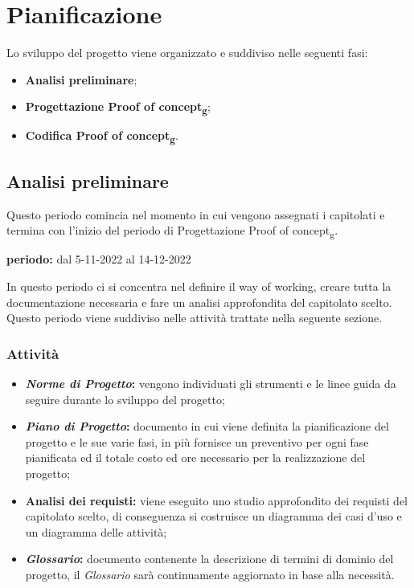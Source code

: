 \section{Pianificazione}
Lo sviluppo del progetto viene organizzato e suddiviso nelle seguenti fasi:
\begin{itemize}
\item \textbf{Analisi preliminare};
\item \textbf{Progettazione Proof of concept\textsubscript{g}};
\item \textbf{Codifica Proof of concept\textsubscript{g}}.
\end{itemize}


\subsection{Analisi preliminare}
Questo periodo comincia nel momento in cui vengono assegnati i capitolati e termina con l'inizio del periodo di Progettazione Proof of concept\textsubscript{g}.\\
\begin{center}
\textbf{periodo:} dal 5-11-2022 al 14-12-2022\\
\end{center}
In questo periodo ci si concentra nel definire il way of working, creare tutta la documentazione necessaria e fare un analisi approfondita del capitolato scelto.  Questo periodo viene suddiviso nelle attività trattate nella seguente sezione.

\subsubsection{Attività}
\begin{itemize}
\item \textbf{\textit{Norme di Progetto}:} vengono individuati gli strumenti e le linee guida da seguire durante lo sviluppo del progetto;
\item \textbf{\textit{Piano di Progetto}:} documento in cui viene definita la pianificazione del progetto e le sue varie fasi,  in più fornisce un preventivo per ogni fase pianificata ed il totale costo ed ore necessario per la realizzazione del progetto;
\item \textbf{Analisi dei requisti:} viene eseguito uno studio approfondito dei requisti del capitolato scelto,  di conseguenza si costruisce un diagramma dei casi d'uso e un diagramma delle attività;
\item \textbf{\textit{Glossario}: } documento contenente la descrizione di termini di dominio del progetto, il \textit{Glossario} sarà continuamente aggiornato in base alla necessità.
\end{itemize}

